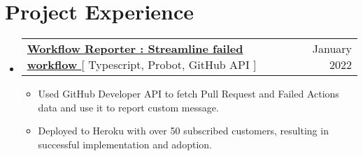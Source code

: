 \documentclass[letterpaper,11pt]{article}
\makeatletter
\newcommand{\resumeItem}[1]{
  \item\small{
    {#1 \vspace{-2pt}}
  }
}
\newcommand{\resumeSubheading}[4]{
  \vspace{-2pt}\item
    \begin{tabular*}{0.97\textwidth}[t]{l@{\extracolsep{\fill}}r}
      \textbf{#1} & #2 \\
      \textit{\small#3} & \textit{\small #4} \\
    \end{tabular*}\vspace{-7pt}
}
\newcommand{\resumeProjectHeading}[2]{
    \item
    \begin{tabular*}{0.97\textwidth}{l@{\extracolsep{\fill}}r}
      \small#1 & #2 \\
    \end{tabular*}\vspace{-7pt}
}
\newcommand{\resumeSubHeadingListStart}{\begin{itemize}[leftmargin=0.15in, label={}]}
\newcommand{\resumeSubHeadingListEnd}{\end{itemize}}
\newcommand{\resumeItemListStart}{\begin{itemize}}
\newcommand{\resumeItemListEnd}{\end{itemize}\vspace{-5pt}}
\makeatother
\begin{document}
    
       




\section{Project Experience}
    

    \resumeSubHeadingListStart
      \resumeProjectHeading
          {\textbf{\href{https://github.com/marketplace/workflow-reporter} {Workflow Reporter : Streamline failed workflow }}{[ Typescript, Probot, GitHub API ]}}{January 2022}
          \resumeItemListStart
           \resumeItem{Used GitHub Developer API to fetch Pull Request and Failed Actions data and use it to report custom message.}
           \resumeItem{Deployed to Heroku with over 50 subscribed customers, resulting in successful implementation and adoption.}
          \resumeItemListEnd
    \resumeSubHeadingListEnd
\end{document}
